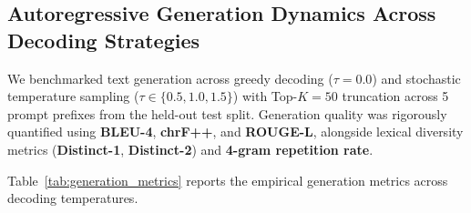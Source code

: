 \documentclass[11pt,a4paper]{article}
\begin{document}
\subsection{Autoregressive Generation Dynamics Across Decoding Strategies}
We benchmarked text generation across greedy decoding ($\tau=0.0$) and stochastic temperature sampling ($\tau \in \{0.5, 1.0, 1.5\}$) with Top-$K=50$ truncation across 5 prompt prefixes from the held-out test split. Generation quality was rigorously quantified using \textbf{BLEU-4}, \textbf{chrF++}, and \textbf{ROUGE-L}, alongside lexical diversity metrics (\textbf{Distinct-1}, \textbf{Distinct-2}) and \textbf{4-gram repetition rate}.

Table~\ref{tab:generation_metrics} reports the empirical generation metrics across decoding temperatures.

\begin{table}[htbp]
\centering
\small
\caption{Automated Generation Quality Metrics Across Decoding Temperatures ($\tau \in \{0.0, 0.5, 1.0, 1.5\}$).}
\label{tab:generation_metrics}
\vspace{2pt}
\end{table}
\end{document}
